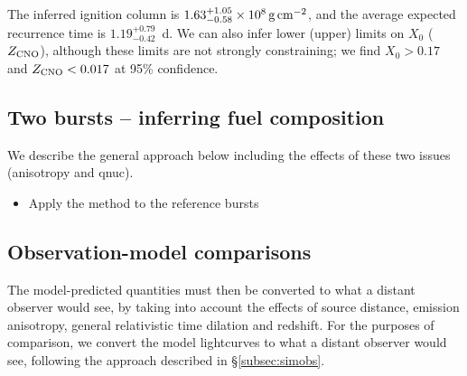 \documentclass{aastex63}
\newcommand{\Xb}{\ensuremath{\overline{X}}}
\begin{document}
The inferred ignition column is $1.63_{-0.58}^{+1.05}\times10^8\,{\rm g\,cm^{-2}}$, and the average expected recurrence time is $1.19_{-0.42}^{+0.79}$~d. 
%
We can also infer lower (upper) limits on $X_0$ ($Z_{\rm CNO}$), although these limits are not strongly constraining; we find $X_0>0.17$ and $Z_{\rm  CNO}<0.017$ at 95\% confidence.


\subsection{Two bursts -- inferring fuel composition} 
\label{subsec:fuelcomp}

We describe the general approach below including the effects of these two issues (anisotropy and qnuc).

\begin{itemize}
\item Apply the method to the reference bursts
\end{itemize}

\subsection{Observation-model comparisons} 
\label{subsec:lccompare}

The model-predicted quantities must then be converted to what a distant observer would see, by taking into account the effects of source distance, emission anisotropy, general relativistic time dilation and redshift. For the purposes of comparison, we convert the model lightcurves to what a distant observer would see, following the approach described in \S\ref{subsec:simobs}.
\end{document}
